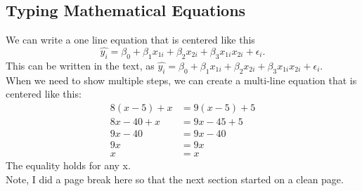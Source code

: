 \documentclass{article}\usepackage[]{graphicx}\usepackage[]{xcolor}
\begin{document}
\begin{multicols}{2}
\subsection{Typing Mathematical Equations}
We can write a one line equation that is centered like this
\[\widehat{y_i} = \beta_0 + \beta_1 x_{1i} + \beta_2 x_{2i} + \beta_3 x_{1i} x_{2i} + \epsilon_i.\]
This can be written in the text, as 
$ \widehat{y_i} = \beta_0 + \beta_1 x_{1i} + \beta_2 x_{2i} + \beta_3 x_{1i} x_{2i} + \epsilon_i.\ $
\\ \indent When we need to show multiple steps, we can create a 
multi-line equation that is centered like this:
\begin{align*}
8(x - 5) + x &= 9(x - 5) + 5 \\
8x - 40 + x &= 9x - 45 + 5 \tag{Distributing}\\
9x - 40 &= 9x - 40 \tag{Combining like terms}\\
9x &= 9x \tag{Adding 40 to both sides} \\
x &= x \tag{Dividing both sides by 9}
\end{align*}
The equality holds for any x.
\\ \indent Note, I did a page break here so that the next section
started on a clean page.
\pagebreak
\vspace{2em}

\end{multicols}
\end{document}
